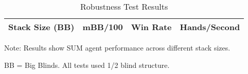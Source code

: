 
\begin{table}[htbp]
\centering
\caption{Robustness Test Results}
\label{tab:robustness_results}
\begin{tabular}{lccc}
\toprule
Stack Size (BB) & mBB/100 & Win Rate & Hands/Second \\
\midrule

\bottomrule
\end{tabular}
\begin{tablenotes}
\small
\item Note: Results show SUM agent performance across different stack sizes.
\item BB = Big Blinds. All tests used 1/2 blind structure.
\end{tablenotes}
\end{table}
